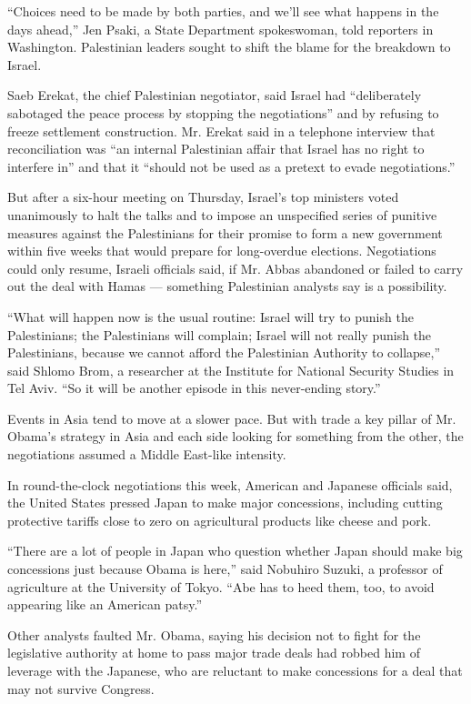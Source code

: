 ``Choices need to be made by both parties, and we'll see what happens in
the days ahead,'' Jen Psaki, a State Department spokeswoman, told
reporters in Washington. Palestinian leaders sought to shift the blame
for the breakdown to Israel.

Saeb Erekat, the chief Palestinian negotiator, said Israel had
``deliberately sabotaged the peace process by stopping the
negotiations'' and by refusing to freeze settlement construction. Mr.
Erekat said in a telephone interview that reconciliation was ``an
internal Palestinian affair that Israel has no right to interfere in''
and that it ``should not be used as a pretext to evade negotiations.''

But after a six-hour meeting on Thursday, Israel's top ministers voted
unanimously to halt the talks and to impose an unspecified series of
punitive measures against the Palestinians for their promise to form a
new government within five weeks that would prepare for long-overdue
elections. Negotiations could only resume, Israeli officials said, if
Mr. Abbas abandoned or failed to carry out the deal with Hamas ---
something Palestinian analysts say is a possibility.

``What will happen now is the usual routine: Israel will try to punish
the Palestinians; the Palestinians will complain; Israel will not really
punish the Palestinians, because we cannot afford the Palestinian
Authority to collapse,'' said Shlomo Brom, a researcher at the Institute
for National Security Studies in Tel Aviv. ``So it will be another
episode in this never-ending story.''

Events in Asia tend to move at a slower pace. But with trade a key
pillar of Mr. Obama's strategy in Asia and each side looking for
something from the other, the negotiations assumed a Middle East-like
intensity.

In round-the-clock negotiations this week, American and Japanese
officials said, the United States pressed Japan to make major
concessions, including cutting protective tariffs close to zero on
agricultural products like cheese and pork.

``There are a lot of people in Japan who question whether Japan should
make big concessions just because Obama is here,'' said Nobuhiro Suzuki,
a professor of agriculture at the University of Tokyo. ``Abe has to heed
them, too, to avoid appearing like an American patsy.''

Other analysts faulted Mr. Obama, saying his decision not to fight for
the legislative authority at home to pass major trade deals had robbed
him of leverage with the Japanese, who are reluctant to make concessions
for a deal that may not survive Congress.

